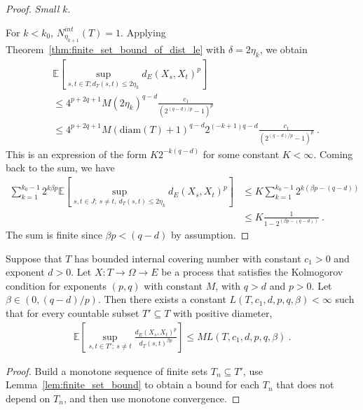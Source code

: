 \begin{proof}
\emph{Small $k$}.

For $k < k_0$, $N^{int}_{\eta_{k+1}}(T) = 1$. Applying Theorem~\ref{thm:finite_set_bound_of_dist_le} with $\delta = 2 \eta_k$, we obtain
\begin{align*}
  &\mathbb{E}\left[ \sup_{s, t \in T; d_T(s, t) \le 2 \eta_k} d_E(X_s, X_t)^p \right]
  \\
  &\le 4^{p+2q+1} M (2 \eta_k)^{q-d} \frac{c_1}{\left( 2^{(q -d)/p} - 1\right)^p}
  \\
  &\le 4^{p+2q+1} M (\mathrm{diam}(T) + 1)^{q-d} 2^{(-k+1)q-d} \frac{c_1}{\left( 2^{(q -d)/p} - 1\right)^p}
  \: .
\end{align*}
This is an expression of the form $K 2^{-k(q-d)}$ for some constant $K < \infty$.
Coming back to the sum, we have
\begin{align*}
  \sum_{k=1}^{k_0 - 1} 2^{k \beta p} \mathbb{E}\left[ \sup_{s, t \in J;\: s \ne t, \: d_T(s, t) \le 2 \eta_k} d_E(X_s, X_t)^p \right]
  &\le K \sum_{k=1}^{k_0 - 1} 2^{k (\beta p - (q-d))}
  \\
  &\le K \frac{1}{1 - 2^{(\beta p - (q-d))}}
  \: .
\end{align*}
The sum is finite since $\beta p < (q - d)$ by assumption.
\end{proof}


\begin{theorem}\label{thm:countable_set_bound}
  \leanok
Suppose that $T$ has bounded internal covering number with constant $c_1>0$ and exponent $d > 0$.
Let $X : T \to \Omega \to E$ be a process that satisfies the Kolmogorov condition for exponents $(p,q)$ with constant $M$, with $q > d$ and $p > 0$.
Let $\beta \in(0, (q - d)/p)$.
Then there exists a constant $L(T, c_1, d, p, q, \beta) < \infty$ such that for every countable subset $T' \subseteq T$ with positive diameter,
\begin{align*}
  \mathbb{E}\left[ \sup_{s, t \in T';\: s \ne t} \frac{d_E(X_s, X_t)^p}{d_T(s, t)^{\beta p}} \right]
  \le M L(T, c_1, d, p, q, \beta)
  \: .
\end{align*}
\end{theorem}

\begin{proof}
Build a monotone sequence of finite sets $T_n \subseteq T'$, use Lemma~\ref{lem:finite_set_bound} to obtain a bound for each $T_n$ that does not depend on $T_n$, and then use monotone convergence.
\end{proof}


